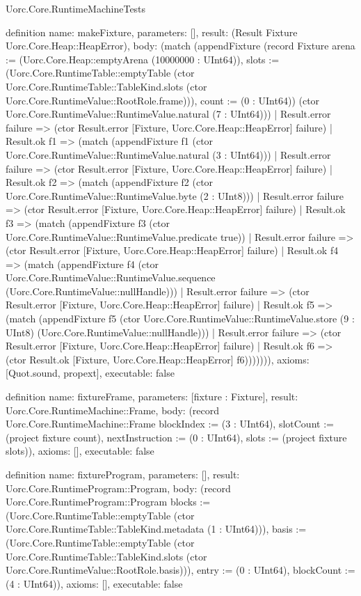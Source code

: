 \begin{lexlean}{Uorc.Core.RuntimeMachineTests}
\begin{semanticmodule}
definition{
  name: makeFixture,
  parameters: [],
  result: (Result Fixture Uorc.Core.Heap::HeapError),
  body: (match (appendFixture (record Fixture {arena := (Uorc.Core.Heap::emptyArena (10000000 : UInt64)), slots := (Uorc.Core.RuntimeTable::emptyTable (ctor Uorc.Core.RuntimeTable::TableKind.slots (ctor Uorc.Core.RuntimeValue::RootRole.frame))), count := (0 : UInt64)}) (ctor Uorc.Core.RuntimeValue::RuntimeValue.natural (7 : UInt64)))
    | Result.error failure => (ctor Result.error [Fixture, Uorc.Core.Heap::HeapError] failure)
    | Result.ok f1 => (match (appendFixture f1 (ctor Uorc.Core.RuntimeValue::RuntimeValue.natural (3 : UInt64)))
      | Result.error failure => (ctor Result.error [Fixture, Uorc.Core.Heap::HeapError] failure)
      | Result.ok f2 => (match (appendFixture f2 (ctor Uorc.Core.RuntimeValue::RuntimeValue.byte (2 : UInt8)))
        | Result.error failure => (ctor Result.error [Fixture, Uorc.Core.Heap::HeapError] failure)
        | Result.ok f3 => (match (appendFixture f3 (ctor Uorc.Core.RuntimeValue::RuntimeValue.predicate true))
          | Result.error failure => (ctor Result.error [Fixture, Uorc.Core.Heap::HeapError] failure)
          | Result.ok f4 => (match (appendFixture f4 (ctor Uorc.Core.RuntimeValue::RuntimeValue.sequence (Uorc.Core.RuntimeValue::nullHandle)))
            | Result.error failure => (ctor Result.error [Fixture, Uorc.Core.Heap::HeapError] failure)
            | Result.ok f5 => (match (appendFixture f5 (ctor Uorc.Core.RuntimeValue::RuntimeValue.store (9 : UInt8) (Uorc.Core.RuntimeValue::nullHandle)))
              | Result.error failure => (ctor Result.error [Fixture, Uorc.Core.Heap::HeapError] failure)
              | Result.ok f6 => (ctor Result.ok [Fixture, Uorc.Core.Heap::HeapError] f6))))))),
  axioms: [Quot.sound, propext],
  executable: false
}

definition{
  name: fixtureFrame,
  parameters: [fixture : Fixture],
  result: Uorc.Core.RuntimeMachine::Frame,
  body: (record Uorc.Core.RuntimeMachine::Frame {blockIndex := (3 : UInt64), slotCount := (project fixture count), nextInstruction := (0 : UInt64), slots := (project fixture slots)}),
  axioms: [],
  executable: false
}

definition{
  name: fixtureProgram,
  parameters: [],
  result: Uorc.Core.RuntimeProgram::Program,
  body: (record Uorc.Core.RuntimeProgram::Program {blocks := (Uorc.Core.RuntimeTable::emptyTable (ctor Uorc.Core.RuntimeTable::TableKind.metadata (1 : UInt64))), basis := (Uorc.Core.RuntimeTable::emptyTable (ctor Uorc.Core.RuntimeTable::TableKind.slots (ctor Uorc.Core.RuntimeValue::RootRole.basis))), entry := (0 : UInt64), blockCount := (4 : UInt64)}),
  axioms: [],
  executable: false
}


\end{semanticmodule}
\end{lexlean}
